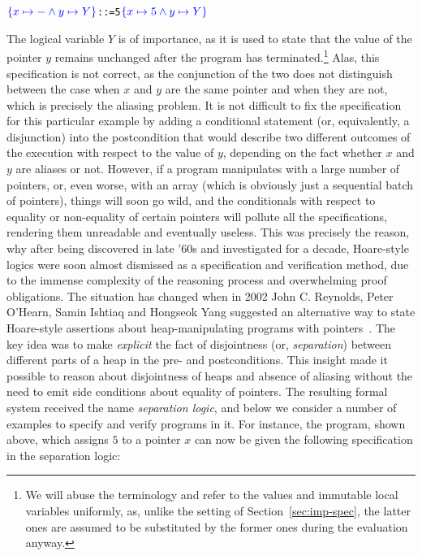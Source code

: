 \begin{alltt}
\(\spec{x\mapsto{-}\wedge{y}\mapsto{Y}}\)  ::= 5 \(\spec{x\mapsto{5}\wedge{y}\mapsto{Y}}\)
\end{alltt}

The logical variable $Y$ is of importance, as it is used to state that
the value of the pointer $y$ remains unchanged after the program has
terminated.\footnote{We will abuse the terminology and refer to the
values and immutable local variables uniformly, as, unlike the setting
of Section~\ref{sec:imp-spec}, the latter ones are assumed to be
substituted by the former ones during the evaluation anyway.} Alas,
this specification is not correct, as the conjunction of the two does
not distinguish between the case when $x$ and $y$ are the same pointer
and when they are not, which is precisely the aliasing problem. It is
not difficult to fix the specification for this particular example by
adding a conditional statement (or, equivalently, a disjunction) into
the postcondition that would describe two different outcomes of the
execution with respect to the value of $y$, depending on the fact
whether $x$ and $y$ are aliases or not. However, if a program
manipulates with a large number of pointers, or, even worse, with an
array (which is obviously just a sequential batch of pointers), things
will soon go wild, and the conditionals with respect to equality or
non-equality of certain pointers will pollute all the specifications,
rendering them unreadable and eventually useless. This was precisely
the reason, why after being discovered in late '60s and investigated
for a decade, Hoare-style logics were soon almost dismissed as a
specification and verification method, due to the immense complexity
of the reasoning process and overwhelming proof obligations.
The situation has changed when in 2002 John C. Reynolds, Peter
O'Hearn, Samin Ishtiaq and Hongseok Yang suggested an alternative way
to state Hoare-style assertions about heap-manipulating programs with
pointers~\cite{Reynolds:LICS02}. The key idea was to make \textit{explicit}
the fact of disjointness (or, \textit{separation}) between different parts of
a heap in the pre- and postconditions. This insight made it possible
to reason about disjointness of heaps and absence of aliasing without
the need to emit side conditions about equality of pointers. The
resulting formal system received the name \textit{separation logic}, and
below we consider a number of examples to specify and verify programs
in it.
For instance, the program, shown above, which assigns $5$ to a pointer
$x$ can now be given the following specification in the separation
logic:

